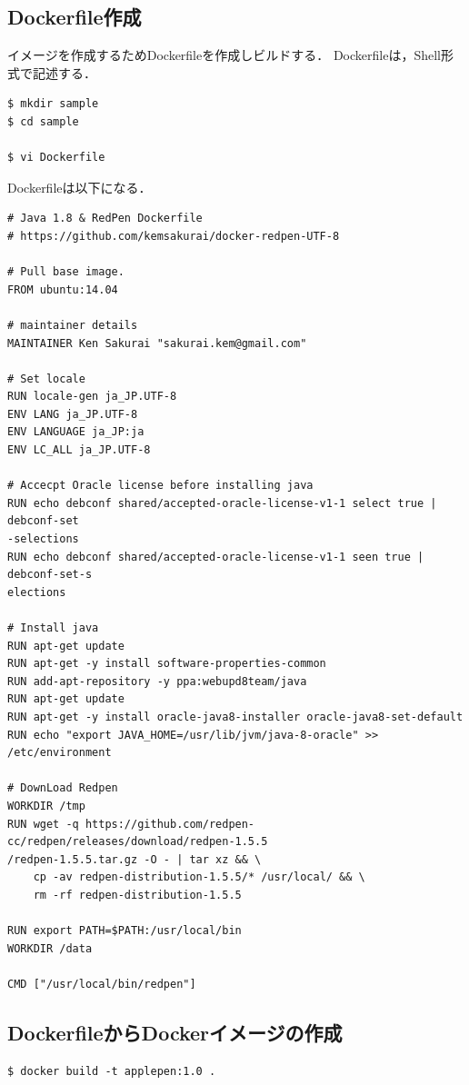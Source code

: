 \newpage
\subsection{Dockerfile作成}
イメージを作成するためDockerfileを作成しビルドする．
Dockerfileは，Shell形式で記述する．

\begin{lstlisting}[basicstyle=\ttfamily\footnotesize, frame=single]
$ mkdir sample
$ cd sample

$ vi Dockerfile
\end{lstlisting}

Dockerfileは以下になる．
\begin{lstlisting}[basicstyle=\ttfamily\footnotesize, frame=single]
# Java 1.8 & RedPen Dockerfile
# https://github.com/kemsakurai/docker-redpen-UTF-8

# Pull base image.
FROM ubuntu:14.04

# maintainer details
MAINTAINER Ken Sakurai "sakurai.kem@gmail.com"

# Set locale
RUN locale-gen ja_JP.UTF-8
ENV LANG ja_JP.UTF-8
ENV LANGUAGE ja_JP:ja
ENV LC_ALL ja_JP.UTF-8

# Accecpt Oracle license before installing java
RUN echo debconf shared/accepted-oracle-license-v1-1 select true | debconf-set
-selections
RUN echo debconf shared/accepted-oracle-license-v1-1 seen true | debconf-set-s
elections

# Install java
RUN apt-get update
RUN apt-get -y install software-properties-common
RUN add-apt-repository -y ppa:webupd8team/java
RUN apt-get update
RUN apt-get -y install oracle-java8-installer oracle-java8-set-default
RUN echo "export JAVA_HOME=/usr/lib/jvm/java-8-oracle" >> /etc/environment

# DownLoad Redpen
WORKDIR /tmp
RUN wget -q https://github.com/redpen-cc/redpen/releases/download/redpen-1.5.5
/redpen-1.5.5.tar.gz -O - | tar xz && \
    cp -av redpen-distribution-1.5.5/* /usr/local/ && \
    rm -rf redpen-distribution-1.5.5

RUN export PATH=$PATH:/usr/local/bin
WORKDIR /data

CMD ["/usr/local/bin/redpen"]
\end{lstlisting}


\newpage
\subsection{DockerfileからDockerイメージの作成}

\begin{lstlisting}[basicstyle=\ttfamily\footnotesize, frame=single]
$ docker build -t applepen:1.0 .
\end{lstlisting}


